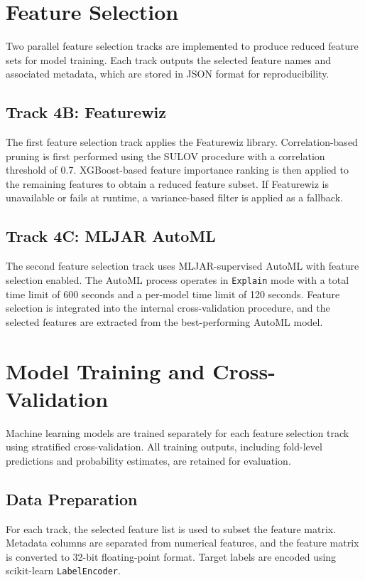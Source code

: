 \section{Feature Selection}

Two parallel feature selection tracks are implemented to produce reduced feature sets for model training. Each track outputs the selected feature names and associated metadata, which are stored in JSON format for reproducibility.

\subsection{Track 4B: Featurewiz}

The first feature selection track applies the Featurewiz library. Correlation-based pruning is first performed using the SULOV procedure with a correlation threshold of 0.7. XGBoost-based feature importance ranking is then applied to the remaining features to obtain a reduced feature subset. If Featurewiz is unavailable or fails at runtime, a variance-based filter is applied as a fallback.

\subsection{Track 4C: MLJAR AutoML}

The second feature selection track uses MLJAR-supervised AutoML with feature selection enabled. The AutoML process operates in \texttt{Explain} mode with a total time limit of 600 seconds and a per-model time limit of 120 seconds. Feature selection is integrated into the internal cross-validation procedure, and the selected features are extracted from the best-performing AutoML model.

\section{Model Training and Cross-Validation}

Machine learning models are trained separately for each feature selection track using stratified cross-validation. All training outputs, including fold-level predictions and probability estimates, are retained for evaluation.

\subsection{Data Preparation}

For each track, the selected feature list is used to subset the feature matrix. Metadata columns are separated from numerical features, and the feature matrix is converted to 32-bit floating-point format. Target labels are encoded using scikit-learn \texttt{LabelEncoder}.

